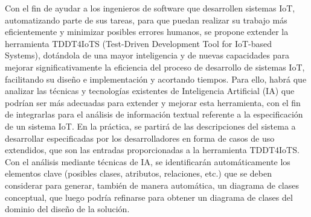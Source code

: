 
Con el fin de ayudar a los ingenieros de software que desarrollen sistemas IoT,
automatizando parte de sus tareas, para que puedan realizar su trabajo más eficientemente
y minimizar posibles errores humanos, se propone extender la herramienta TDDT4IoTS
(Test-Driven Development Tool for IoT-based Systems), dotándola de una mayor inteligencia
y de nuevas capacidades para mejorar significativamente la eficiencia del proceso de
desarrollo de sistemas IoT, facilitando su diseño e implementación y acortando tiempos.
Para ello, habrá que analizar las técnicas y tecnologías existentes de Inteligencia Artificial
(IA) que podrían ser más adecuadas para extender y mejorar esta herramienta, con el fin de
integrarlas para el análisis de información textual referente a la especificación de un sistema
IoT. En la práctica, se partirá de las descripciones del sistema a desarrollar especificadas por
los desarrolladores en forma de casos de uso extendidos, que son las entradas
proporcionadas a la herramienta TDDT4IoTS. Con el análisis mediante técnicas de IA, se
identificarán automáticamente los elementos clave (posibles clases, atributos, relaciones,
etc.) que se deben considerar para generar, también de manera automática, un diagrama
de clases conceptual, que luego podría refinarse para obtener un diagrama de clases del
dominio del diseño de la solución.
